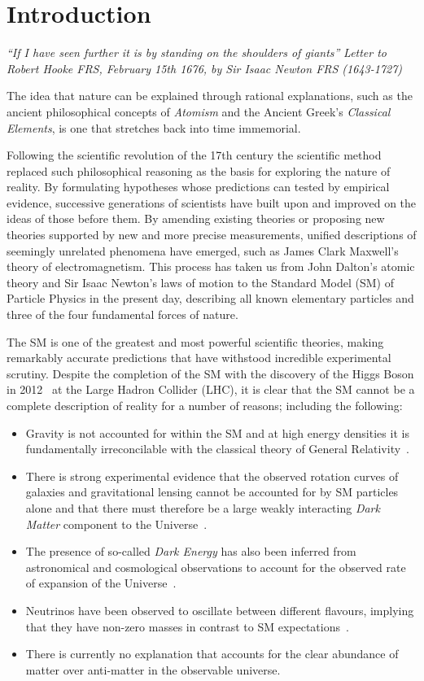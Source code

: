 \chapter{Introduction}\label{chapter:intro}

\emph{``If I have seen further it is by standing on the shoulders of giants''}
\emph{Letter to Robert Hooke FRS, February 15th 1676, by Sir Isaac Newton FRS (1643-1727)}

The idea that nature can be explained through rational explanations, such as the ancient philosophical concepts of \emph{Atomism} and the Ancient Greek's \emph{Classical Elements}, is one that stretches back into time immemorial.

Following the scientific revolution of the 17th century the scientific method replaced such philosophical reasoning as the basis for exploring the nature of reality.
By formulating hypotheses whose predictions can tested by empirical evidence, successive generations of scientists
have built upon and improved on the ideas of those before them.
By amending existing theories or proposing new theories supported by new and more precise measurements, unified descriptions of seemingly unrelated phenomena have emerged, such as James Clark Maxwell's theory of electromagnetism.
This process has taken us from John Dalton's atomic theory and Sir Isaac Newton's laws of motion to the Standard Model (SM) of Particle Physics in the present day, describing all known elementary particles and three of the four fundamental forces of nature.


The SM is one of the greatest and most powerful scientific theories, making remarkably accurate predictions that have withstood incredible experimental scrutiny.
Despite the completion of the SM with the discovery of the Higgs Boson in 2012~\cite{HiggsCMS,HiggsATLAS} at the Large Hadron Collider (LHC), it is clear that the SM cannot be a complete description of reality for a number of reasons; including the following:
\begin{itemize}
\item Gravity is not accounted for within the SM and at high energy densities it is fundamentally irreconcilable with the classical theory of General Relativity~\cite{Sola:2013gha}.
\item There is strong experimental evidence that the observed rotation curves of galaxies and gravitational lensing cannot be accounted for by SM particles alone and that there must therefore be a large weakly interacting \emph{Dark Matter} component to the Universe~\cite{Bertone:2004pz}.
\item The presence of so-called \emph{Dark Energy} has also been inferred from astronomical and cosmological observations to account for the observed rate of expansion of the Universe~\cite{Peebles:2002gy}.
\item Neutrinos have been observed to oscillate between different flavours, implying that they have non-zero masses in contrast to SM expectations~\cite{Fukuda:1998mi,Ahmad:2001an}.
\item There is currently no explanation that accounts for the clear abundance of matter over anti-matter in the observable universe.
\end{itemize}

